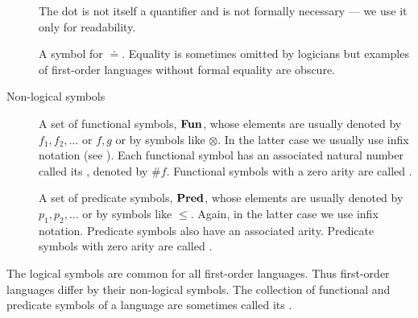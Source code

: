 \begin{definition}
\begin{description}
\begin{thmenum}[series=def:first_order_language]
      The dot is not itself a quantifier and is not formally necessary --- we use it only for readability.

       A symbol for  \( \doteq \). Equality is sometimes omitted by logicians but examples of first-order languages without formal equality are obscure.
    \end{thmenum}

    \item[Non-logical symbols]
    \hfill
    \begin{thmenum}[resume=def:first_order_language]
       A set of functional symbols, \( \operatorname{\mathbf{Fun}} \), whose elements are usually denoted by \( f_1, f_2, \ldots \) or \( f, g \) or by symbols like \( \otimes \). In the latter case we usually use infix notation (see ). Each functional symbol has an associated natural number called its , denoted by \( \# f \). Functional symbols with a zero arity are called .

       A set of predicate symbols, \( \operatorname{\mathbf{Pred}} \), whose elements are usually denoted by \( p_1, p_2, \ldots \) or by symbols like \( \leq \). Again, in the latter case we use infix notation. Predicate symbols also have an associated arity. Predicate symbols with zero arity are called .
    \end{thmenum}
  \end{description}

  The logical symbols are common for all first-order languages. Thus first-order languages differ by their non-logical symbols. The collection of functional and predicate symbols of a language are sometimes called its .
\end{definition}


